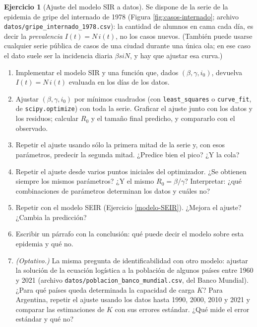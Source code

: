\documentclass[12pt, a4paper]{amsbook}
\theoremstyle{remark}
\theoremstyle{definition}
\newtheorem{ejer}[teo]{Ejercicio}
\numberwithin{section}{chapter}
\numberwithin{subsection}{section}
\numberwithin{equation}{section}
\numberwithin{figure}{chapter}
\begin{document}
\begin{ejer}[Ajuste del modelo SIR a datos]\label{lab:SIR-ajuste}
Se dispone de la serie de la epidemia de gripe del internado de 1978 (Figura \ref{fig:casos-internado}; archivo \nolinkurl{datos/gripe_internado_1978.csv}): la cantidad de alumnos en cama cada día, es decir la \emph{prevalencia} $I(t) = N\,i(t)$, no los casos nuevos. (También puede usarse cualquier serie pública de casos de una ciudad durante una única ola; en ese caso el dato suele ser la incidencia diaria $\beta s i N$, y hay que ajustar esa curva.)
\begin{enumerate}
\item Implementar el modelo SIR y una función que, dados $(\beta,\gamma,i_0)$, devuelva $I(t)=N\,i(t)$ evaluada en los días de los datos.
\item Ajustar $(\beta,\gamma,i_0)$ por mínimos cuadrados (con \lstinline{least_squares} o \lstinline{curve_fit}, de \lstinline{scipy.optimize}) con toda la serie. Graficar el ajuste junto con los datos y los residuos; calcular $R_0$ y el tamaño final predicho, y compararlo con el observado.
\item Repetir el ajuste usando sólo la primera mitad de la serie y, con esos parámetros, predecir la segunda mitad. ¿Predice bien el pico? ¿Y la cola?
\item Repetir el ajuste desde varios puntos iniciales del optimizador. ¿Se obtienen siempre los mismos parámetros? ¿Y el mismo $R_0=\beta/\gamma$? Interpretar: ¿qué combinaciones de parámetros determinan los datos y cuáles no?
\item Repetir con el modelo SEIR (Ejercicio \ref{modelo-SEIR}). ¿Mejora el ajuste? ¿Cambia la predicción?
\item Escribir un párrafo con la conclusión: qué puede decir el modelo sobre esta epidemia y qué no.
\item \emph{(Optativo.)} La misma pregunta de identificabilidad con otro modelo: ajustar la solución de la ecuación logística a la población de algunos países entre 1960 y 2021 (archivo \nolinkurl{datos/poblacion_banco_mundial.csv}, del Banco Mundial). ¿Para qué países queda determinada la capacidad de carga $K$? Para Argentina, repetir el ajuste usando los datos hasta 1990, 2000, 2010 y 2021 y comparar las estimaciones de $K$ con sus errores estándar. ¿Qué mide el error estándar y qué no?
\end{enumerate}
\end{ejer}
\end{document}
